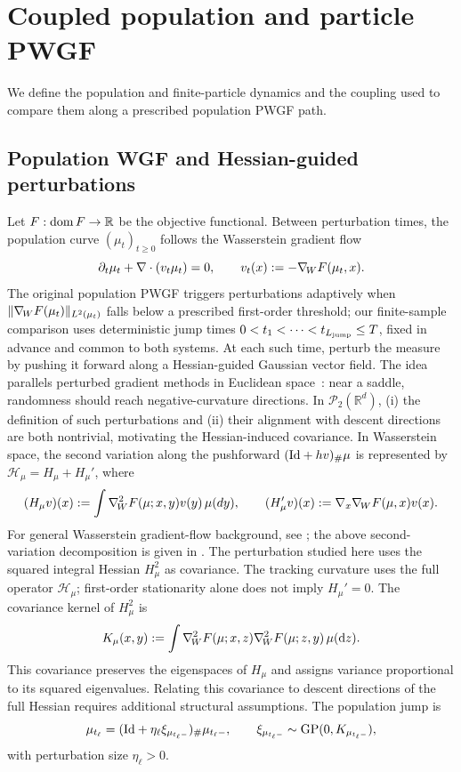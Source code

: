 \section{Coupled population and particle PWGF}
\label{sec:pwgf-coupling}

We define the population and finite-particle dynamics and the coupling used to
compare them along a prescribed population PWGF path.

\subsection{Population WGF and Hessian-guided perturbations}
\label{subsec:population-pwgf}

Let \(F:\operatorname{dom}F\to\mathbb{R}\) be the objective functional.
Between perturbation times, the
population curve \((\mu_t)_{t\ge 0}\) follows the Wasserstein gradient flow
\begin{equation}
    \partial_t \mu_t + \nabla\cdot(v_t\mu_t)=0,
    \qquad
    v_t(x):=-\nabla_{\!W} F(\mu_t,x).
    \label{eq:population-wgf}
\end{equation}
The original population PWGF triggers perturbations adaptively when
\(\|\nabla_{\!W} F(\mu_t)\|_{L^2(\mu_t)}\) falls below a prescribed first-order threshold;
our finite-sample comparison uses deterministic jump times
$0<t_1<\cdots<t_{L_{\mathrm{jump}}}\le T$, fixed in advance and common to both systems.
At each such time, \citet{yamamoto2025hessianguided} perturb the measure by pushing it forward along a Hessian-guided Gaussian vector field.  The idea parallels perturbed
gradient methods in Euclidean space~\citep{GeHuangJinYuan2015,pmlr-v75-jin18a}: near a saddle,
randomness should reach negative-curvature directions.  In
\(\mathcal P_2(\mathbb R^d)\), (i) the definition of such perturbations and (ii) their
alignment with descent directions are both nontrivial, motivating the
Hessian-induced covariance.
In Wasserstein space, the second variation
along the pushforward \((\mathrm{Id}+hv)_\#\mu\) is represented by
\(\mathcal H_\mu=H_\mu+H_\mu'\), where
\[
    (H_\mu v)(x):=\int \nabla^{2}_{\!W} F(\mu;x,y)v(y)\,\mu(dy),
    \qquad
    (H_\mu'v)(x):=\nabla_x \nabla_{\!W} F(\mu,x)v(x).
\]
For general Wasserstein gradient-flow background, see
\citet{ambrosio2005gradient}; the above second-variation decomposition is given
in \citet[Propositions~3.2 and~C.7]{yamamoto2025hessianguided}.
The perturbation studied here uses the squared integral
Hessian $H_\mu^2$ as covariance. The tracking curvature uses the full operator
$\mathcal H_\mu$; first-order stationarity alone does not imply $H_\mu'=0$.
The covariance kernel of \(H_\mu^2\) is
\[
    K_\mu(x,y)
    :=
    \int
        \nabla^{2}_{\!W} F(\mu;x,z)\nabla^{2}_{\!W} F(\mu;z,y)\,\mu(\dd z).
    \label{eq:hessian-kernel}
\]
This covariance preserves the eigenspaces of $H_\mu$ and assigns variance proportional to its squared eigenvalues. Relating this covariance to descent directions of the full Hessian requires additional structural assumptions. The population jump is
\begin{equation}
    \mu_{t_\ell}
    =
    (\mathrm{Id}+\eta_\ell \xi_{\mu_{t_\ell-}})_\#\mu_{t_\ell-},
    \qquad
    \xi_{\mu_{t_\ell-}}\sim \mathrm{GP}(0,K_{\mu_{t_\ell-}}),
    \label{eq:population-jump}
\end{equation}
with perturbation size \(\eta_\ell>0\).

